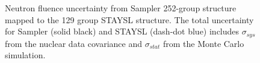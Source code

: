 \begin{figure}[!htbp]
	\centering
	\vfill
	\vfill
	\vfill
	\caption[Neutron fluence uncertainty from the Sampler 252-group structure mapped to the 129-group STAYSL structure.]{Neutron fluence uncertainty from Sampler 252-group structure mapped to the 129 group STAYSL structure. The total uncertainty for Sampler (solid black) and STAYSL (dash-dot blue) includes $\sigma_{sys}$ from the nuclear data covariance and $\sigma_{stat}$ from the Monte Carlo simulation.}
	\label{fig:fluxu21}
\end{figure}

